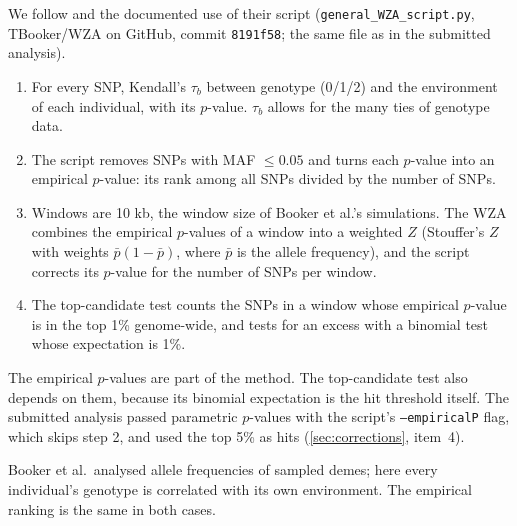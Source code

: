 We follow \citet{booker_wza_2024} and the documented use of their script
(\texttt{general\_WZA\_script.py}, TBooker/WZA on GitHub, commit
\texttt{8191f58}; the same file as in the submitted analysis).
\begin{enumerate}
\item For every SNP, Kendall's $\tau_b$ between genotype (0/1/2) and the
  environment of each individual, with its $p$-value. $\tau_b$ allows for
  the many ties of genotype data.
\item The script removes SNPs with MAF $\leq 0.05$ and turns each
  $p$-value into an empirical $p$-value: its rank among all SNPs divided by
  the number of SNPs.
\item Windows are 10 kb, the window size of Booker et al.'s simulations.
  The WZA combines the empirical $p$-values of a window into a weighted $Z$
  (Stouffer's $Z$ with weights $\bar{p}(1-\bar{p})$, where $\bar{p}$ is the
  allele frequency), and the script corrects its $p$-value for the number
  of SNPs per window.
\item The top-candidate test counts the SNPs in a window whose empirical
  $p$-value is in the top 1\% genome-wide, and tests for an excess with a
  binomial test whose expectation is 1\%.
\end{enumerate}

\noindent The empirical $p$-values are part of the method. The
top-candidate test also depends on them, because its binomial expectation
is the hit threshold itself. The submitted analysis passed parametric
$p$-values with the script's \texttt{--empiricalP} flag, which skips step
2, and used the top 5\% as hits (\cref{sec:corrections}, item~4).

Booker et al.\ analysed allele frequencies of sampled demes; here every
individual's genotype is correlated with its own environment. The
empirical ranking is the same in both cases.



